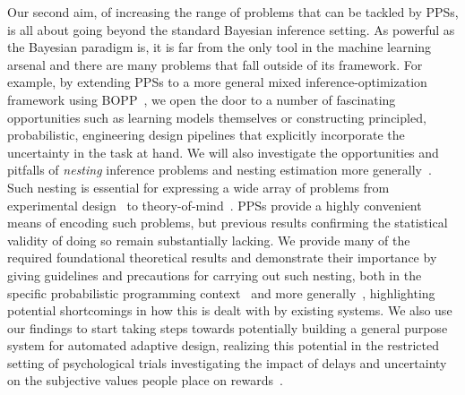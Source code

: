 Our second aim, of increasing the range of problems that can be tackled by PPSs, is all about
going beyond the standard Bayesian inference setting.  As powerful as the Bayesian paradigm is,
it is far from the only tool in the machine learning arsenal and there are many problems that fall
outside of its framework.  For example, by extending PPSs to a more general mixed
inference-optimization framework using BOPP~\citep{rainforth2016bayesian}, we open the door to
a number of fascinating opportunities such as learning models themselves or constructing
principled, probabilistic, engineering design pipelines that explicitly incorporate
the uncertainty in the task at hand.  We will also investigate the opportunities and pitfalls
of \emph{nesting} inference problems and nesting estimation more
generally~\citep{rainforth2017pitfalls}.  Such nesting is essential for expressing a wide array
of problems from experimental design~\citep{chaloner1995bayesian} to
theory-of-mind~\citep{stuhlmuller2014reasoning}.  PPSs provide a highly convenient means
of encoding such problems, but previous results confirming the statistical validity of doing
so remain substantially lacking.  We provide many of the required foundational theoretical results and
demonstrate their importance by giving guidelines and precautions for carrying out such nesting,
both in the specific probabilistic programming context~\citep{rainforth2017nestpp}
and more generally~\citep{rainforth2017pitfalls}, highlighting potential
shortcomings in how this is dealt with by existing systems.  We also use our findings to start
taking steps towards potentially building a general purpose system for automated adaptive
design, realizing this potential in the restricted setting of psychological trials
investigating the impact of delays and uncertainty on the subjective values people place
on rewards~\citep{vincent2017darc}.